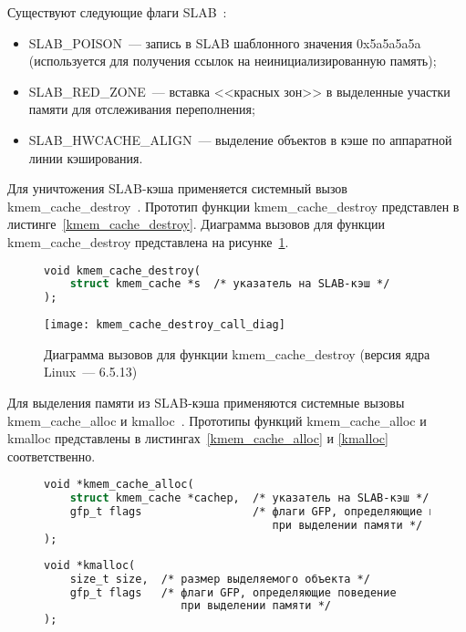 Существуют следующие флаги SLAB~\cite{mm_api}:
\begin{itemize}
	\item SLAB\_POISON~--- запись в SLAB шаблонного значения 0x5a5a5a5a (используется для получения ссылок на неинициализированную память);
	\item SLAB\_RED\_ZONE~--- вставка <<красных зон>> в выделенные участки памяти для отслеживания переполнения;
	\item SLAB\_HWCACHE\_ALIGN~--- выделение объектов в кэше по аппаратной линии кэширования.
\end{itemize}

Для уничтожения SLAB-кэша применяется системный вызов kmem\_cache\_destroy~\cite{slab_info}.
Прототип функции kmem\_cache\_destroy представлен в листинге~\ref{kmem_cache_destroy}.
Диаграмма вызовов для функции kmem\_cache\_destroy представлена на рисунке~\ref{kmem_cache_destroy_call_diag}.
\begin{figure}[H]
	\begin{lstlisting}[label=kmem_cache_destroy,caption=Прототип функции kmem\_cache\_create (версия ядра Linux~--- 6.5.13),language=Caml]
void kmem_cache_destroy(
	struct kmem_cache *s  /* указатель на SLAB-кэш */
);
	\end{lstlisting}
\end{figure}
\begin{figure}[H]
	\centering
	\texttt{[image: kmem\_cache\_destroy\_call\_diag]}
	\caption{Диаграмма вызовов для функции kmem\_cache\_destroy (версия ядра Linux~--- 6.5.13)}
	\label{kmem_cache_destroy_call_diag}
\end{figure}

Для выделения памяти из SLAB-кэша применяются системные вызовы kmem\_cache\_alloc и kmalloc~\cite{slab_info}.
Прототипы функций kmem\_cache\_alloc и kmalloc представлены в листингах~\ref{kmem_cache_alloc} и \ref{kmalloc} соответственно.
\begin{figure}[H]
	\begin{lstlisting}[label=kmem_cache_alloc,caption=Прототип функции kmem\_cache\_alloc (версия ядра Linux~--- 6.5.13),language=Caml]
void *kmem_cache_alloc(
	struct kmem_cache *cachep,  /* указатель на SLAB-кэш */
	gfp_t flags                 /* флаги GFP, определяющие поведение
	                               при выделении памяти */
);
	\end{lstlisting}
\end{figure}
\begin{figure}[H]
	\begin{lstlisting}[label=kmalloc,caption=Прототип функции kmalloc (версия ядра Linux~--- 6.5.13),language=Caml]
void *kmalloc(
	size_t size,  /* размер выделяемого объекта */
	gfp_t flags   /* флаги GFP, определяющие поведение
	                 при выделении памяти */
);
	\end{lstlisting}
\end{figure}

